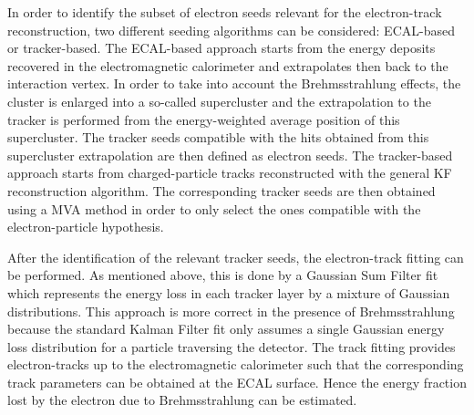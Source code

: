 
In order to identify the subset of electron seeds relevant for the electron-track reconstruction, two different seeding algorithms can be considered: ECAL-based or tracker-based.
The ECAL-based approach starts from the energy deposits recovered in the electromagnetic calorimeter and extrapolates then back to the interaction vertex. In order to take into account the Brehmsstrahlung effects, the cluster is enlarged into a so-called supercluster and the extrapolation to the tracker is performed from the energy-weighted average position of this supercluster. The tracker seeds compatible with the hits obtained from this supercluster extrapolation are then defined as electron seeds. The tracker-based approach starts from charged-particle tracks reconstructed with the general KF reconstruction algorithm. The corresponding tracker seeds are then obtained using a MVA method in order to only select the ones compatible with the electron-particle hypothesis.

After the identification of the relevant tracker seeds, the electron-track fitting can be performed. As mentioned above, this is done by a Gaussian Sum Filter fit which represents the energy loss in each tracker layer by a mixture of Gaussian distributions. This approach is more correct in the presence of Brehmsstrahlung because the standard Kalman Filter fit only assumes a single Gaussian energy loss distribution for a particle traversing the detector. The track fitting provides electron-tracks up to the electromagnetic calorimeter such that the corresponding track parameters can be obtained at the ECAL surface. Hence the energy fraction lost by the electron due to Brehmsstrahlung can be estimated.


